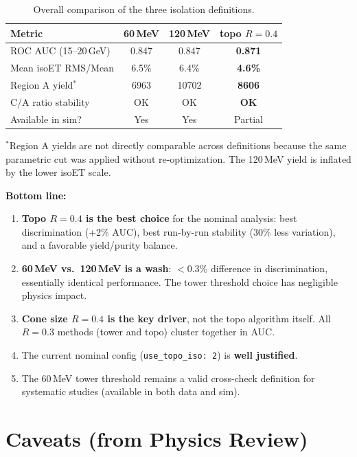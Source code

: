 \documentclass[11pt]{article}
\begin{document}
\begin{table}[htb]
  \centering
  \caption{Overall comparison of the three isolation definitions.}
  \label{tab:summary}
  \begin{tabular}{lccc}
    \toprule
    Metric & 60\,MeV & 120\,MeV & topo $R=0.4$ \\
    \midrule
    ROC AUC (15--20\,GeV) & 0.847 & 0.847 & \textbf{0.871} \\
    Mean isoET RMS/Mean   & 6.5\% & 6.4\% & \textbf{4.6\%} \\
    Region A yield$^{*}$  & 6963  & 10702 & \textbf{8606} \\
    C/A ratio stability   & OK    & OK & \textbf{OK} \\
    Available in sim?     & Yes   & Yes & Partial \\
    \bottomrule
  \end{tabular}
\end{table}

\noindent
$^{*}$Region A yields are not directly comparable across definitions because
the same parametric cut was applied without re-optimization.  The 120\,MeV
yield is inflated by the lower isoET scale.

\textbf{Bottom line:}
\begin{enumerate}
  \item \textbf{Topo $R=0.4$ is the best choice} for the nominal analysis:
        best discrimination (+2\% AUC), best run-by-run stability
        (30\% less variation), and a favorable yield/purity balance.
  \item \textbf{60\,MeV vs.\ 120\,MeV is a wash}: $<$0.3\% difference in
        discrimination, essentially identical performance.  The tower threshold
        choice has negligible physics impact.
  \item \textbf{Cone size $R=0.4$ is the key driver}, not the topo algorithm
        itself.  All $R=0.3$ methods (tower and topo) cluster together in AUC.
  \item The current nominal config (\texttt{use\_topo\_iso:~2}) is
        \textbf{well justified}.
  \item The 60\,MeV tower threshold remains a valid cross-check definition
        for systematic studies (available in both data and sim).
\end{enumerate}

\section{Caveats (from Physics Review)}
\end{document}
